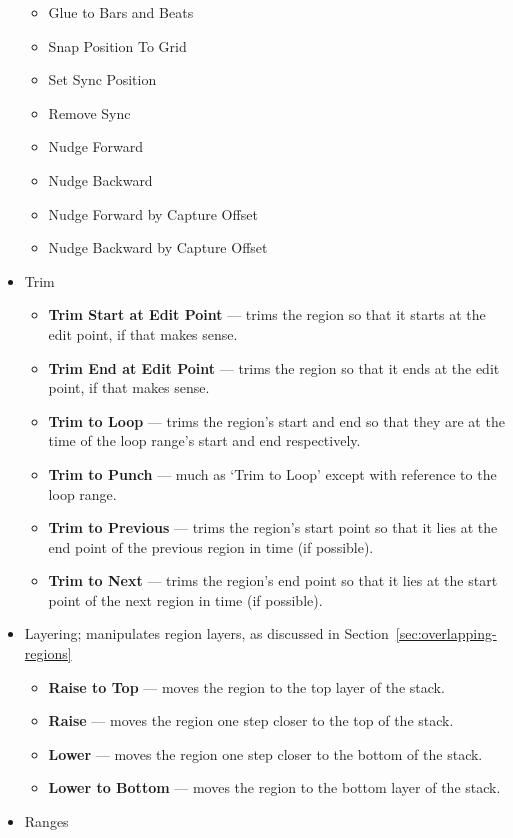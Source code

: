 \documentclass[10pt,a4paper]{book}
\begin{document}
\begin{itemize}
\begin{itemize}
\item Glue to Bars and Beats
\item Snap Position To Grid
\item Set Sync Position
\item Remove Sync
\item Nudge Forward
\item Nudge Backward
\item Nudge Forward by Capture Offset
\item Nudge Backward by Capture Offset
\end{itemize}
\item Trim
\begin{itemize}
\item \textbf{Trim Start at Edit Point} --- trims the region so that
  it starts at the edit point, if that makes sense.
\item \textbf{Trim End at Edit Point} --- trims the region so that
  it ends at the edit point, if that makes sense.
\item \textbf{Trim to Loop} --- trims the region's start and end so
  that they are at the time of the loop range's start and end
  respectively.
\item \textbf{Trim to Punch} --- much as `Trim to Loop' except with
  reference to the loop range.
\item \textbf{Trim to Previous} --- trims the region's start point so
  that it lies at the end point of the previous region in time (if
  possible).
\item \textbf{Trim to Next} --- trims the region's end point so
  that it lies at the start point of the next region in time (if
  possible).
\end{itemize}
\item Layering; manipulates region layers, as discussed in
  Section~\ref{sec:overlapping-regions}
\begin{itemize}
\item \textbf{Raise to Top} --- moves the region to the top layer of
  the stack.
\item \textbf{Raise} --- moves the region one step closer to the top
  of the stack.
\item \textbf{Lower} --- moves the region one step closer to the
  bottom of the stack.
\item \textbf{Lower to Bottom} --- moves the region to the bottom
  layer of the stack.
\end{itemize}
\item Ranges
\begin{itemize}

\end{itemize}
\end{itemize}
\end{document}
